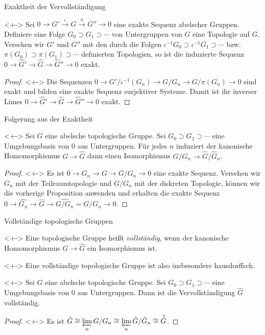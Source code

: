 \begin{frame}{Exaktheit der Vervollständigung}
	\begin{corollary}<+->
		Sei \(0 \to G' \xrightarrow{\iota} G \xrightarrow{\pi} G'' \to 0\) eine exakte Sequenz
		abelscher Gruppen. Definiere eine Folge \(G_0 \supset G_1 \supset \dotsb\) von
		Untergruppen von \(G\) eine Topologie auf \(G\). Versehen wir \(G'\) und \(G''\)
		mit den durch die Folgen \(\iota^{-1} G_0 \supset \iota^{-1} G_1 \supset \dotsb\) bzw.\
		\(\pi(G_0) \supset \pi(G_1) \supset \dotsb\) definierten Topologien, so ist
		die induzierte Sequenz
		\(0 \to \hat G' \to \hat G \to \hat G'' \to 0\) exakt.
	\end{corollary}
	\begin{proof}<+->
		Die Sequenzen \(0 \to G'/\iota^{-1} (G_n) \to G/G_n \to G/\pi(G_n) \to 0\) sind exakt
		und bilden eine exakte Sequenz surjektiver Systeme. Damit ist ihr inverser Limes
		\(0 \to \hat G' \to \hat G \to \hat G'' \to 0\) exakt.
	\end{proof}
\end{frame}

\begin{frame}{Folgerung aus der Exaktheit}
	\begin{corollary}<+->
		Sei \(G\) eine abelsche topologische Gruppe. Sei \(G_0 \supset G_1 \supset \dotsb\) eine
		Umgebungsbasis von \(0\) aus Untergruppen. Für jedes \(n\) induziert der kanonische Homomorphismus
		\(G \to \hat G\) dann einen Isomorphismus \(G/G_n \to \hat G/\hat G_n\).
	\end{corollary}
	\begin{proof}<+->
		Es ist \(0 \to G_n \to G \to G/G_n \to 0\) eine exakte Sequenz. Versehen wir \(G_n\) mit
		der Teilraumtopologie und \(G/G_n\) mit der diskreten Topologie,
		können wir die vorherige Proposition anwenden und erhalten die exakte Sequenz
		\(0 \to \hat{G_n} \to \hat G \to \widehat{G/G_n} = G/G_n \to 0\).
	\end{proof}
\end{frame}

\begin{frame}{Vollständige topologische Gruppen}
	\begin{definition}<+->
		Eine topologische Gruppe heißt \emph{vollständig}, wenn der kanonische Homomorphismus
		\(G \to \hat G\) ein Isomorphismus ist.
	\end{definition}
	\begin{remark}<+->
		Eine vollständige topologische Gruppe ist also insbesondere hausdorffsch.
	\end{remark}
	\begin{proposition}<+->
		Sei \(G\) eine abelsche topologische Gruppe. Sei \(G_0 \supset G_1 \supset \dotsb\) eine
		Umgebungsbasis von \(0\) aus Untergruppen. Dann ist die Vervollständigung \(\hat G\) vollständig.
	\end{proposition}
	\begin{proof}<+->
		Es ist \(\hat G \cong \varprojlim\limits_n G/G_n \cong \varprojlim\limits_n \hat G/\hat G_n
		\cong \hat{\hat G}\).
	\end{proof}
\end{frame}

